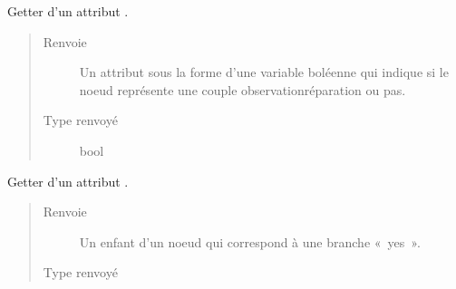 \documentclass[letterpaper,10pt,french]{sphinxmanual}
\begin{document}
\begin{fulllineitems}
\begin{fulllineitems}
\label{\detokenize{index:StrategyTree.Observation.get_obs_rep_couples}}
Getter d’un attribut .
\begin{quote}\begin{description}
\item[{Renvoie}] \leavevmode
{} \textendash{} Un attribut sous la forme d’une variable boléenne qui indique si le noeud représente une couple
observation\sphinxhyphen{}réparation ou pas.

\item[{Type renvoyé}] \leavevmode
bool

\end{description}\end{quote}

\end{fulllineitems}


\begin{fulllineitems}
\label{\detokenize{index:StrategyTree.Observation.get_yes_child}}
Getter d’un attribut .
\begin{quote}\begin{description}
\item[{Renvoie}] \leavevmode
{} \textendash{} Un enfant d’un noeud qui correspond à une branche « yes ».

\item[{Type renvoyé}] \leavevmode
{\hyperref[\detokenize{index:StrategyTree.NodeST}]{}}

\end{description}\end{quote}

\end{fulllineitems}



\end{fulllineitems}
\end{document}
